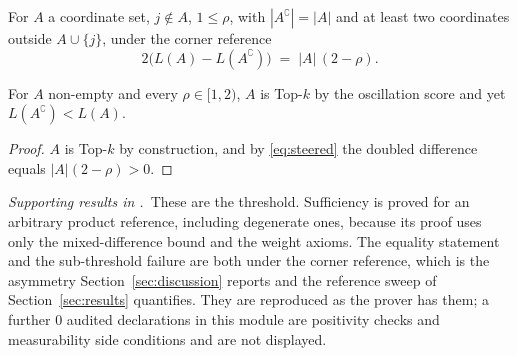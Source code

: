 \begin{theorem}
\label{thm:steered}
For $A$ a coordinate set, $j\notin A$, $1\le\rho$, with $|A^{\complement}|=|A|$ and at least
two coordinates outside $A\cup\{j\}$, under the corner reference
\begin{equation}
2\bigl(L(A)-L(A^{\complement})\bigr)\;=\;|A|\,(2-\rho).
\label{eq:steered}
\end{equation}
\end{theorem}


\begin{theorem}
\label{thm:subthreshold}
For $A$ non-empty and every $\rho\in[1,2)$, $A$ is Top-$k$ by the oscillation score and yet
$L(A^{\complement})<L(A)$.
\end{theorem}

\begin{proof}
$A$ is Top-$k$ by construction, and by \eqref{eq:steered} the doubled difference equals
$|A|(2-\rho)>0$.
\end{proof}


\noindent\emph{Supporting results in .}~These are the threshold. Sufficiency is proved for an arbitrary product reference, including degenerate ones, because its proof uses only the mixed-difference bound and the weight axioms. The equality statement and the sub-threshold failure are both under the corner reference, which is the asymmetry Section~\ref{sec:discussion} reports and the reference sweep of Section~\ref{sec:results} quantifies. They are reproduced as the prover has them; a further $0$ audited declarations in this module are positivity checks and measurability side conditions and are not displayed.

